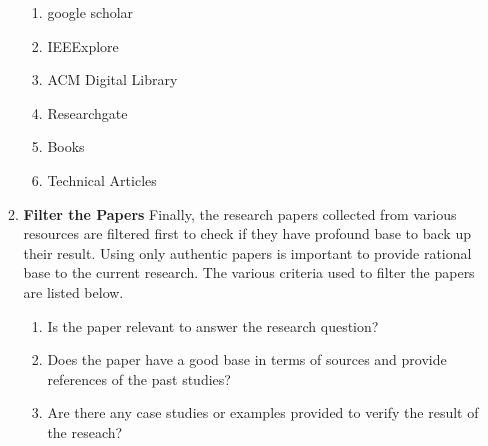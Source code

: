 \begin{enumerate}
\begin{enumerate}
\begin{enumerate}
\item google scholar
\item IEEExplore
\item ACM Digital Library
\item Researchgate
\item Books
\item Technical Articles
\end{enumerate}
\item \textbf{Filter the Papers}
Finally, the research papers collected from various resources are filtered first to check if they have profound base to back up their result. Using only authentic papers is important to provide rational base to the current research. The various criteria used to filter the papers are listed below.
\begin{enumerate}
\item Is the paper relevant to answer the research question?
\item Does the paper have a good base in terms of sources and provide references of the past studies? 
\item Are there any case studies or examples provided to verify the result of the reseach?
\end{enumerate}
\end{enumerate}


\end{enumerate}
